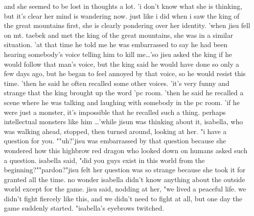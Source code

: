 and she seemed to be lost in thoughts a lot.
'i don't know what she is thinking, but it's clear her mind is wandering now.
 just like i did when i saw the king of the great mountains first, she is clearly pondering over her identity.
'when jisu fell on mt.
 taebek and met the king of the great mountains, she was in a similar situation.
'at that time he told me he was embarrassed to say he had been hearing somebody's voice telling him to kill me…'so jisu asked the king if he would follow that man's voice, but the king said he would have done so only a few days ago, but he began to feel annoyed by that voice, so he would resist this time.
'then he said he often recalled some other voices.
'it's very funny and strange that the king brought up the word 'pc room.
'then he said he recalled a scene where he was talking and laughing with somebody in the pc room.
'if he were just a monster, it's impossible that he recalled such a thing.
 perhaps intellectual monsters like him …'while jisun was thinking about it, isabella, who was walking ahead, stopped, then turned around, looking at her.
"i have a question for you.
""uh?'jisu was embarrassed by that question because she wondered how this highbrow red dragon who looked down on humans asked such a question.
isabella said, "did you guys exist in this world from the beginning?""pardon?"jisu felt her question was so strange because she took it for granted all the time.
no wonder isabella didn't know anything about the outside world except for the game.
jisu said, nodding at her, "we lived a peaceful life.
 we didn't fight fiercely like this, and we didn't need to fight at all, but one day the game suddenly started.
"isabella's eyebrows twitched.

